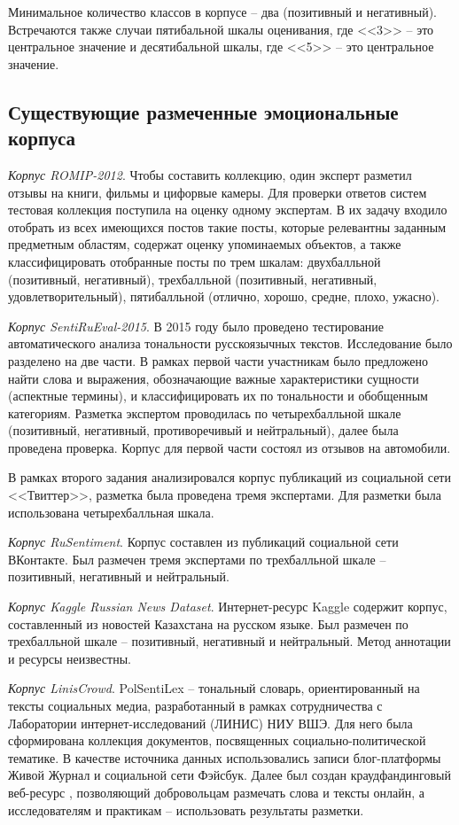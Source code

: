 Минимальное количество классов в корпусе -- два (позитивный и негативный). \cite{КотельниковЕ.2021} Встречаются также случаи пятибальной шкалы оценивания, где <<3>> -- это центральное значение и десятибальной шкалы, где <<5>> -- это центральное значение.

\subsection{Существующие размеченные эмоциональные корпуса}
\textit{Корпус ROMIP-2012}. \cite{Chetviorkin2012} Чтобы составить коллекцию, один эксперт разметил отзывы на книги, фильмы и цифорвые камеры. Для проверки ответов систем тестовая коллекция поступила на оценку одному экспертам.  В их задачу входило отобрать из всех имеющихся постов  такие посты, которые релевантны заданным предметным областям, содержат оценку упоминаемых объектов, а также классифицировать отобранные посты по трем шкалам: двухбалльной (позитивный, негативный), трехбалльной (позитивный, негативный, удовлетворительный), пятибалльной (отлично, хорошо, средне, плохо, ужасно).

\textit{Корпус SentiRuEval-2015}. \cite{Loukachevitch2015} В 2015 году было проведено тестирование автоматического анализа тональности русскоязычных текстов. Исследование было разделено на две части. В рамках первой части участникам было предложено найти слова и выражения, обозначающие важные характеристики сущности (аспектные термины), и классифицировать их по тональности и обобщенным категориям. Разметка экспертом проводилась по четырехбалльной шкале (позитивный, негативный, противоречивый и нейтральный), далее была проведена проверка. Корпус для первой части состоял из отзывов на автомобили.

В рамках второго задания анализировался корпус публикаций из социальной сети <<Твиттер>>, разметка была проведена тремя экспертами. Для разметки была использована четырехбалльная шкала. 

\textit{Корпус RuSentiment}. Корпус составлен из публикаций социальной сети ВКонтакте. \cite{Rogers2018} Был размечен тремя экспертами по трехбалльной шкале -- позитивный, негативный и нейтральный. 

\textit{Корпус Kaggle Russian News Dataset}. Интернет-ресурс Kaggle \cite{kaggle} содержит корпус, составленный из новостей Казахстана на русском языке. Был размечен по трехбалльной шкале -- позитивный, негативный и нейтральный. Метод аннотации и ресурсы неизвестны. 

\textit{Корпус LinisCrowd}. PolSentiLex \cite{Koltsova2016} -- тональный словарь, ориентированный на тексты социальных медиа, разработанный в рамках сотрудничества с Лаборатории интернет-исследований (ЛИНИС) НИУ ВШЭ. Для него была сформирована коллекция документов, посвященных социально-политической тематике. В  качестве источника данных использовались записи блог-платформы Живой Журнал и социальной сети Фэйсбук. Далее был создан краудфандинговый веб-ресурс \cite{linis}, позволяющий добровольцам размечать слова и тексты онлайн, а исследователям и практикам – использовать результаты разметки. 

